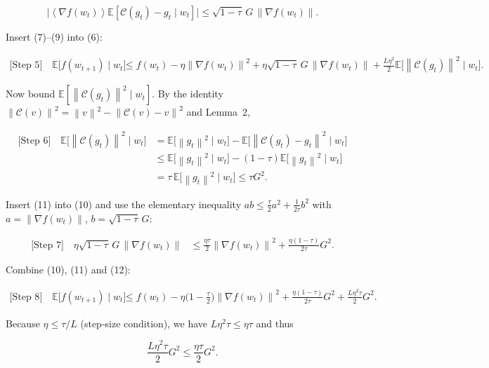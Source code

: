 \documentclass{article}
\newcommand{\E}{\mathbb{E}}
\newcommand{\norm}[1]{\left\|#1\right\|}
\newcommand{\inner}[1]{\left\langle #1 \right\rangle}
\begin{document}
\[
\big|\inner{\nabla f(w_{t})}{\E[\mathcal{C}(g_{t})-g_{t}\mid w_{t}] }\big|
\le \sqrt{1-\tau}\,G\,\norm{\nabla f(w_{t})}.
\tag{9}
\]

Insert (7)–(9) into (6):

\begin{align}
\text{[Step 5]} \quad
\E\!\big[f(w_{t+1})\mid w_{t}\big]
&\le f(w_{t})-\eta\norm{\nabla f(w_{t})}^{2}
   +\eta\sqrt{1-\tau}\,G\,\norm{\nabla f(w_{t})}
   +\frac{L\eta^{2}}{2}\E\!\big[\norm{\mathcal{C}(g_{t})}^{2}\mid w_{t}\big].
\tag{10}
\end{align}

Now bound $\E[\norm{\mathcal{C}(g_{t})}^{2}\mid w_{t}]$.
By the identity $\norm{\mathcal{C}(v)}^{2}= \norm{v}^{2}-\norm{\mathcal{C}(v)-v}^{2}$ and Lemma~2,

\begin{align}
\text{[Step 6]} \quad
\E\!\big[\norm{\mathcal{C}(g_{t})}^{2}\mid w_{t}\big]
&= \E\!\big[\norm{g_{t}}^{2}\mid w_{t}\big]
   -\E\!\big[\norm{\mathcal{C}(g_{t})-g_{t}}^{2}\mid w_{t}\big] \nonumber\\
&\le \E\!\big[\norm{g_{t}}^{2}\mid w_{t}\big]
   -(1-\tau)\E\!\big[\norm{g_{t}}^{2}\mid w_{t}\big] \nonumber\\
&= \tau\,\E\!\big[\norm{g_{t}}^{2}\mid w_{t}\big]
\le \tau G^{2}.
\tag{11}
\end{align}

Insert (11) into (10) and use the elementary inequality
$ab\le\frac{\tau}{2}a^{2}+\frac{1}{2\tau}b^{2}$ with $a=\norm{\nabla f(w_{t})}$,
$b=\sqrt{1-\tau}\,G$:

\begin{align}
\text{[Step 7]} \quad
\eta\sqrt{1-\tau}\,G\,\norm{\nabla f(w_{t})}
&\le \frac{\eta\tau}{2}\norm{\nabla f(w_{t})}^{2}
   +\frac{\eta(1-\tau)}{2\tau}G^{2}. 
\tag{12}
\end{align}

Combine (10), (11) and (12):

\begin{align}
\text{[Step 8]} \quad
\E\!\big[f(w_{t+1})\mid w_{t}\big]
&\le f(w_{t})
   -\eta\Big(1-\frac{\tau}{2}\Big)\norm{\nabla f(w_{t})}^{2}
   +\frac{\eta(1-\tau)}{2\tau}G^{2}
   +\frac{L\eta^{2}\tau}{2}G^{2}. 
\tag{13}
\end{align}

Because $\eta\le \tau/L$ (step‑size condition), we have $L\eta^{2}\tau\le \eta\tau$ and thus

\[
\frac{L\eta^{2}\tau}{2}G^{2}\le\frac{\eta\tau}{2}G^{2}.
\tag{14}
\]
\end{document}
